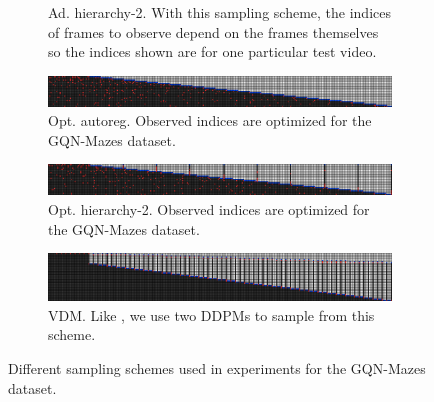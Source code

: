 \begin{figure}[t]
\begin{subfigure}[t]{\textwidth}
        \caption{Ad. hierarchy-2. With this sampling scheme, the indices of frames to observe depend on the frames themselves so the indices shown are for one particular test video.}
    \end{subfigure}
    \begin{subfigure}[t]{\textwidth}
        \includegraphics[width=\textwidth]{figs/fdm/inference-modes/sample_vis_autoreg_optimal-linspace-t-force-nearby_T=300_sampling_10_out_of_20_red_blue_flipped.png}
        \caption{Opt. autoreg. Observed indices are optimized for the GQN-Mazes dataset.} \label{fig:fdm-opt-autoreg}
    \end{subfigure}
    \begin{subfigure}[t]{\textwidth}
        \includegraphics[width=\textwidth]{figs/fdm/inference-modes/sample_vis_hierarchy-2_optimal-linspace-t-force-nearby_T=300_sampling_10_out_of_20_red_blue_flipped.png}
        \caption{Opt. hierarchy-2. Observed indices are optimized for the GQN-Mazes dataset.} \label{fig:fdm-opt-hierarchy-2}
    \end{subfigure}
    \begin{subfigure}[t]{\textwidth}
        \includegraphics[width=\textwidth]{figs/fdm/inference-modes/sample_vis_google_T=300_sampling_None_out_of_None_red_blue_flipped.png}
        \caption{VDM. Like \citet{ho2022video}, we use two DDPMs to sample from this scheme.}
    \end{subfigure}
    \caption{Different sampling schemes used in experiments for the GQN-Mazes dataset.}
    \label{fig:fdm-sampling-schemes}
\end{figure}


